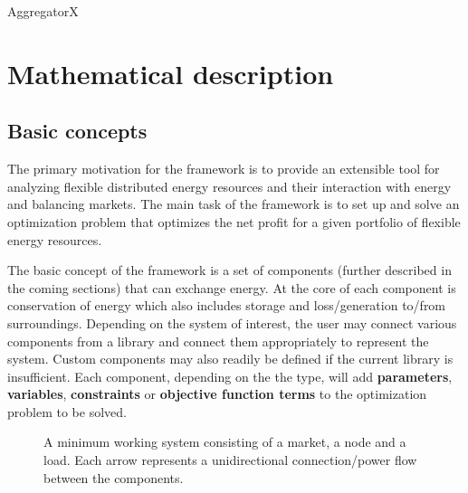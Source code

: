 \documentclass[]{report}
\renewcommand{\emph}{\textbf}
\begin{document}
\vspace*{5cm}

\begin{center}
    {\LARGE  AggregatorX}
\end{center}

\newpage

\tableofcontents

\chapter{Mathematical description}

\section{Basic concepts}
The primary motivation for the framework is to provide an extensible tool for analyzing flexible distributed energy resources and their interaction with energy and balancing markets. The main task of the framework is to set up and solve an optimization problem that optimizes the net profit for a given portfolio of flexible energy resources.

The basic concept of the framework is a set of components (further described in the coming sections) that can exchange energy. At the core of each component is conservation of energy which also includes storage and loss/generation to/from surroundings. Depending on the system of interest, the user may connect various components from a library and connect them appropriately to represent the system. Custom components may also readily be defined if the current library is insufficient. Each component, depending on the the type, will add \emph{parameters}, \emph{variables}, \emph{constraints} or \emph{objective function terms} to the optimization problem to be solved.

\begin{figure}    
    \centering
    \caption{A minimum working system consisting of a market, a node and a load. Each arrow represents a unidirectional connection/power flow between the components.}
    \label{fig:marketload}
\end{figure}
\end{document}
